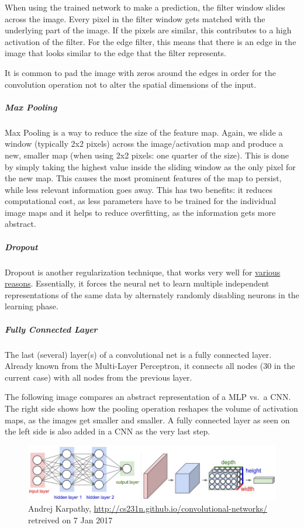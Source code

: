 \documentclass[]{article}
\let\oldsubparagraph\subparagraph
\renewcommand{\subparagraph}[1]{\oldsubparagraph{#1}\mbox{}}
\begin{document}
When using the trained network to make a prediction, the filter window
slides across the image. Every pixel in the filter window gets matched
with the underlying part of the image. If the pixels are similar, this
contributes to a high activation of the filter. For the edge filter,
this means that there is an edge in the image that looks similar to the
edge that the filter represents.

It is common to pad the image with zeros around the edges in order for
the convolution operation not to alter the spatial dimensions of the
input.

\subparagraph{Max Pooling}\label{max-pooling}

Max Pooling is a way to reduce the size of the feature map. Again, we
slide a window (typically 2x2 pixels) across the image/activation map
and produce a new, smaller map (when using 2x2 pixels: one quarter of
the size). This is done by simply taking the highest value inside the
sliding window as the only pixel for the new map. This causes the most
prominent features of the map to persist, while less relevant
information goes away. This has two benefits: it reduces computational
cost, as less parameters have to be trained for the individual image
maps and it helps to reduce overfitting, as the information gets more
abstract.

\subparagraph{Dropout}\label{dropout}

Dropout is another regularization technique, that works very well for
\href{http://neuralnetworksanddeeplearning.com/chap3.html}{various
reasons}. Essentially, it forces the neural net to learn multiple
independent representations of the same data by alternately randomly
disabling neurons in the learning phase.

\subparagraph{Fully Connected Layer}\label{fully-connected-layer}

The last (several) layer(s) of a convolutional net is a fully connected
layer. Already known from the Multi-Layer Perceptron, it connects all
nodes (30 in the current case) with all nodes from the previous layer.

The following image compares an abstract representation of a MLP vs.~a
CNN. The right side shows how the pooling operation reshapes the volume
of activation maps, as the images get smaller and smaller. A fully
connected layer as seen on the left side is also added in a CNN as the
very last step.

\begin{figure}
\centering
\includegraphics{figures/mlp_vs_cnn.png}
\caption{Andrej Karpathy,
\url{http://cs231n.github.io/convolutional-networks/} retreived on 7 Jan
2017}
\end{figure}
\end{document}

